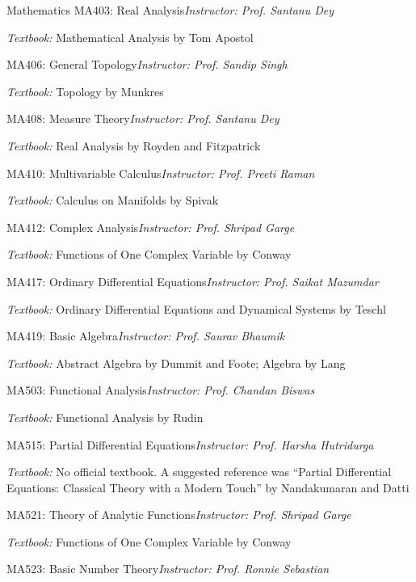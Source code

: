 \begin{rubric}{Mathematics}
    \entry*[AA] MA403: Real Analysis\hfill\emph{Instructor: Prof. Santanu Dey}

    \emph{Textbook:} Mathematical Analysis by Tom Apostol

    \entry*[AA] MA406: General Topology\hfill\emph{Instructor: Prof. Sandip Singh}

    \emph{Textbook:} Topology by Munkres

    \entry*[AA] MA408: Measure Theory\hfill\emph{Instructor: Prof. Santanu Dey}

    \emph{Textbook:} Real Analysis by Royden and Fitzpatrick

    \entry*[AP] MA410: Multivariable Calculus\hfill\emph{Instructor: Prof. Preeti Raman}

    \emph{Textbook:} Calculus on Manifolds by Spivak

    \entry*[AP] MA412: Complex Analysis\hfill\emph{Instructor: Prof. Shripad Garge}

    \emph{Textbook:} Functions of One Complex Variable by Conway

    \entry*[AP] MA417: Ordinary Differential Equations\hfill\emph{Instructor: Prof. Saikat Mazumdar}

    \emph{Textbook:} Ordinary Differential Equations and Dynamical Systems by Teschl 

    \entry*[AA] MA419: Basic Algebra\hfill\emph{Instructor: Prof. Saurav Bhaumik}
    
    \emph{Textbook:} Abstract Algebra by Dummit and Foote; Algebra by Lang

    \entry*[AA] MA503: Functional Analysis\hfill\emph{Instructor: Prof. Chandan Biswas}
    
    \emph{Textbook:} Functional Analysis by Rudin

    \entry*[AP] MA515: Partial Differential Equations\hfill\emph{Instructor: Prof. Harsha Hutridurga}

    \emph{Textbook:} No official textbook. A suggested reference was ``Partial Differential Equations: Classical Theory with a Modern Touch'' by Nandakumaran and Datti

    \entry*[AA] MA521: Theory of Analytic Functions\hfill\emph{Instructor: Prof. Shripad Garge}

    \emph{Textbook:} Functions of One Complex Variable by Conway

    \entry*[AA] MA523: Basic Number Theory\hfill\emph{Instructor: Prof. Ronnie Sebastian}


\end{rubric}
